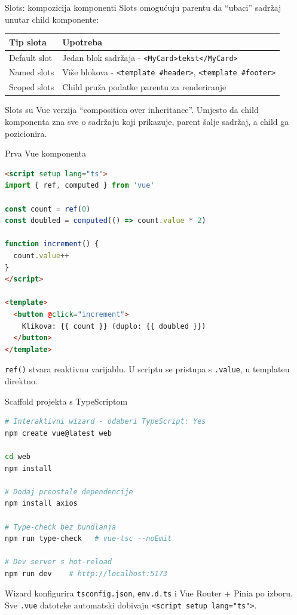 \begin{frame}{Slots: kompozicija komponenti}
Slots omogućuju parentu da \enquote{ubaci} sadržaj unutar child komponente:

\vspace{0.4em}
\begin{tabular}{@{}lp{8cm}@{}}
  \toprule
  \textbf{Tip slota} & \textbf{Upotreba} \\
  \midrule
  Default slot & Jedan blok sadržaja - \texttt{<MyCard>tekst</MyCard>} \\
  Named slots & Više blokova - \texttt{<template \#header>}, \texttt{<template \#footer>} \\
  Scoped slots & Child pruža podatke parentu za renderiranje \\
  \bottomrule
\end{tabular}

\vspace{0.6em}
Slots su Vue verzija \enquote{composition over inheritance}. Umjesto da child komponenta zna sve o sadržaju koji prikazuje, parent šalje sadržaj, a child ga pozicionira.
\end{frame}

\begin{frame}[fragile,shrink=5]{Prva Vue komponenta}
\begin{lstlisting}[language=html]
<script setup lang="ts">
import { ref, computed } from 'vue'

const count = ref(0)
const doubled = computed(() => count.value * 2)

function increment() {
  count.value++
}
</script>

<template>
  <button @click="increment">
    Klikova: {{ count }} (duplo: {{ doubled }})
  </button>
</template>
\end{lstlisting}

\vspace{0.4em}
\texttt{ref()} stvara reaktivnu varijablu. U scriptu se pristupa s \texttt{.value}, u templateu direktno.
\end{frame}

\begin{frame}[fragile,shrink=5]{Scaffold projekta s TypeScriptom}
\begin{lstlisting}[language=bash]
# Interaktivni wizard - odaberi TypeScript: Yes
npm create vue@latest web

cd web
npm install

# Dodaj preostale dependencije
npm install axios

# Type-check bez bundlanja
npm run type-check   # vue-tsc --noEmit

# Dev server s hot-reload
npm run dev    # http://localhost:5173
\end{lstlisting}

\vspace{0.4em}
Wizard konfigurira \texttt{tsconfig.json}, \texttt{env.d.ts} i Vue Router + Pinia po izboru. Sve \texttt{.vue} datoteke automatski dobivaju \texttt{<script setup lang="ts">}.
\end{frame}

